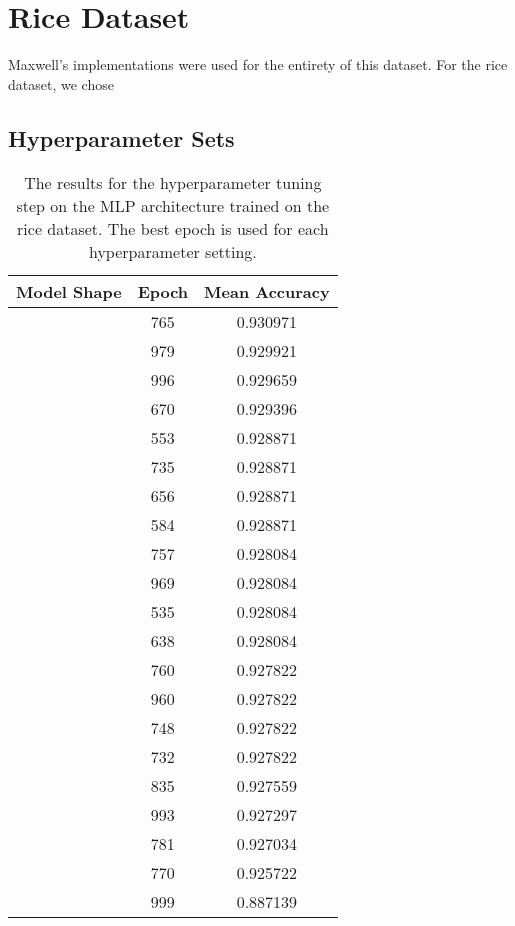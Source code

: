 \section{Rice Dataset}
Maxwell's implementations were used for the entirety of this dataset.
For the rice dataset, we chose 
\subsection{Hyperparameter Sets}
\begin{table}
    \centering
    \begin{tabular}{c|c|c}
        Model Shape    & Epoch & Mean Accuracy \\
        \hline
        [7, 8, 8, 1]   & 765   & 0.930971 \\ \relax
        [7, 2, 1]      & 979   & 0.929921 \\ \relax
        [7, 2, 4, 1]   & 996   & 0.929659 \\ \relax
        [7, 1]         & 670   & 0.929396 \\ \relax
        [7, 16, 16, 1] & 553   & 0.928871 \\ \relax
        [7, 4, 16, 1]  & 735   & 0.928871 \\ \relax
        [7, 2, 16, 1]  & 656   & 0.928871 \\ \relax
        [7, 16, 1]     & 584   & 0.928871 \\ \relax
        [7, 16, 8, 1]  & 757   & 0.928084 \\ \relax
        [7, 8, 2, 1]   & 969   & 0.928084 \\ \relax
        [7, 8, 1]      & 535   & 0.928084 \\ \relax
        [7, 8, 4, 1]   & 638   & 0.928084 \\ \relax
        [7, 16, 2, 1]  & 760   & 0.927822 \\ \relax
        [7, 2, 8, 1]   & 960   & 0.927822 \\ \relax
        [7, 8, 16, 1]  & 748   & 0.927822 \\ \relax
        [7, 16, 4, 1]  & 732   & 0.927822 \\ \relax
        [7, 4, 8, 1]   & 835   & 0.927559 \\ \relax
        [7, 4, 4, 1]   & 993   & 0.927297 \\ \relax
        [7, 4, 1]      & 781   & 0.927034 \\ \relax
        [7, 4, 2, 1]   & 770   & 0.925722 \\ \relax
        [7, 2, 2, 1]   & 999   & 0.887139
    \end{tabular}
    \caption{The results for the hyperparameter tuning step on the MLP architecture trained on the rice
             dataset.
             The best epoch is used for each hyperparameter setting.}
    \label{tab:rice_nn}
\end{table}

